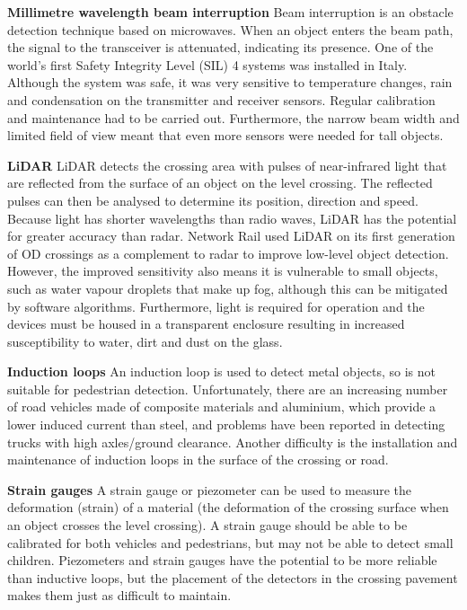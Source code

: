 \documentclass[
]{book}
\begin{document}
\textbf{Millimetre wavelength beam interruption}
Beam interruption is an obstacle detection technique based on microwaves. When an object enters the beam path, the signal to the transceiver is attenuated, indicating its presence. One of the world's first Safety Integrity Level (SIL) 4 systems was installed in Italy. Although the system was safe, it was very sensitive to temperature changes, rain and condensation on the transmitter and receiver sensors. Regular calibration and maintenance had to be carried out. Furthermore, the narrow beam width and limited field of view meant that even more sensors were needed for tall objects.

\textbf{LiDAR}
LiDAR detects the crossing area with pulses of near-infrared light that are reflected from the surface of an object on the level crossing. The reflected pulses can then be analysed to determine its position, direction and speed. Because light has shorter wavelengths than radio waves, LiDAR has the potential for greater accuracy than radar. Network Rail used LiDAR on its first generation of OD crossings as a complement to radar to improve low-level object detection. However, the improved sensitivity also means it is vulnerable to small objects, such as water vapour droplets that make up fog, although this can be mitigated by software algorithms. Furthermore, light is required for operation and the devices must be housed in a transparent enclosure resulting in increased susceptibility to water, dirt and dust on the glass.

\textbf{Induction loops}
An induction loop is used to detect metal objects, so is not suitable for pedestrian detection. Unfortunately, there are an increasing number of road vehicles made of composite materials and aluminium, which provide a lower induced current than steel, and problems have been reported in detecting trucks with high axles/ground clearance. Another difficulty is the installation and maintenance of induction loops in the surface of the crossing or road.

\textbf{Strain gauges}
A strain gauge or piezometer can be used to measure the deformation (strain) of a material (the deformation of the crossing surface when an object crosses the level crossing). A strain gauge should be able to be calibrated for both vehicles and pedestrians, but may not be able to detect small children. Piezometers and strain gauges have the potential to be more reliable than inductive loops, but the placement of the detectors in the crossing pavement makes them just as difficult to maintain.
\end{document}
